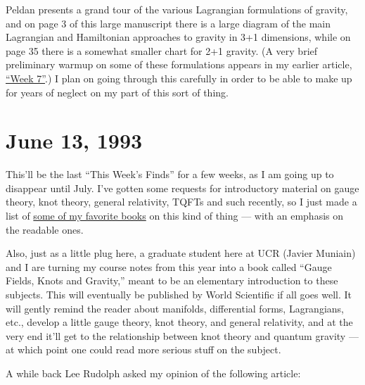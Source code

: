 \documentclass[12pt]{article}
\def\tightlist{}
\renewcommand{\texttt}[1]{%
  \begingroup
  \ttfamily
  \begingroup\lccode`~=`/\lowercase{\endgroup\def~}{/\discretionary{}{}{}}%
  \begingroup\lccode`~=`[\lowercase{\endgroup\def~}{[\discretionary{}{}{}}%
  \begingroup\lccode`~=`.\lowercase{\endgroup\def~}{.\discretionary{}{}{}}%
  \catcode`/=\active\catcode`[=\active\catcode`.=\active
  \scantokens{#1\noexpand}%
  \endgroup
}
\begin{document}
Peldan presents a grand tour of the various Lagrangian formulations of
gravity, and on page 3 of this large manuscript there is a large diagram
of the main Lagrangian and Hamiltonian approaches to gravity in 3+1
dimensions, while on page 35 there is a somewhat smaller chart for 2+1
gravity. (A very brief preliminary warmup on some of these formulations
appears in my earlier article, \protect\hyperlink{week7}{``Week 7''}.) I
plan on going through this carefully in order to be able to make up for
years of neglect on my part of this sort of thing.



\hypertarget{week17}{%
\section{June 13, 1993}\label{week17}}

This'll be the last ``This Week's Finds'' for a few weeks, as I am going
up to disappear until July. I've gotten some requests for introductory
material on gauge theory, knot theory, general relativity, TQFTs and
such recently, so I just made a list of
\href{http://math.ucr.edu/home/baez/books.html}{some of my favorite
books} on this kind of thing --- with an emphasis on the readable ones.

Also, just as a little plug here, a graduate student here at UCR (Javier
Muniain) and I are turning my course notes from this year into a book
called ``Gauge Fields, Knots and Gravity,'' meant to be an elementary
introduction to these subjects. This will eventually be published by
World Scientific if all goes well. It will gently remind the reader
about manifolds, differential forms, Lagrangians, etc., develop a little
gauge theory, knot theory, and general relativity, and at the very end
it'll get to the relationship between knot theory and quantum gravity
--- at which point one could read more serious stuff on the subject.

A while back Lee Rudolph asked my opinion of the following article:

\end{document}
